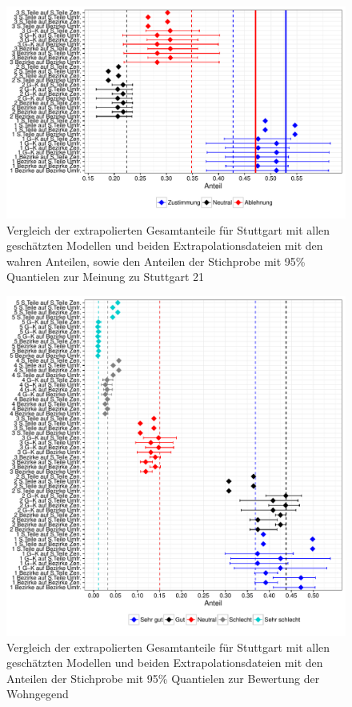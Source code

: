 \documentclass{Vorlage}
\begin{document}
\begin{figure}[h]
 \begin{center}
 \includegraphics[scale=0.8]{Pictures/S21AlleModelle}
 \caption{Vergleich der extrapolierten Gesamtanteile für Stuttgart mit allen geschätzten Modellen und beiden Extrapolationsdateien mit den wahren Anteilen, sowie den Anteilen der Stichprobe mit 95\% Quantielen zur Meinung zu Stuttgart 21}
 \label{S21Alle}
 \end{center}
\end{figure}


\begin{figure}[h]
 \begin{center}
 \includegraphics[scale=0.8]{Pictures/WohngegendAlleModelle}
 \caption{Vergleich der extrapolierten Gesamtanteile für Stuttgart mit allen geschätzten Modellen und beiden Extrapolationsdateien mit den Anteilen der Stichprobe mit 95\% Quantielen zur Bewertung der Wohngegend}
 \label{WAlle}
 \end{center}
\end{figure}
\end{document}
